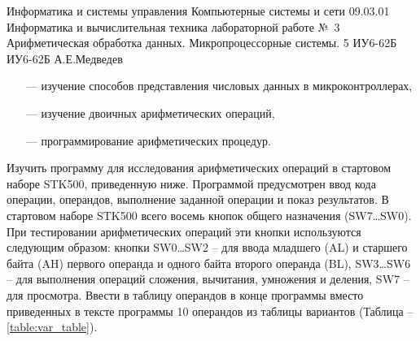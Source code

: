\documentclass{bmstu}
\begin{document}


\makeatletter %
\renewcommand\chapter{\par%
\thispagestyle{plain}%
\@afterindentfalse \secdef\@chapter\@schapter}
\makeatother

\def\numberWork{1}


\makereporttitle
    {Информатика и системы управления} %
    {Компьютерные системы и сети} %
    {09.03.01 Информатика и вычислительная техника} %
    {лабораторной работе №~3} %
    {Арифметическая обработка данных.} %
    {Микропроцессорные системы.} %
    {5} %
    {ИУ6-62Б} %
    {
    	{ИУ6-62Б}
    	{А.Е.Медведев} %
    	{} %
    } 

\chapter{Цель работы:}
\begin{enumerate}
\item[---] изучение способов представления числовых данных в микроконтроллерах, 
\item[---] изучение двоичных арифметических операций, 
\item[---] программирование арифметических процедур.
\end{enumerate}

\chapter{Задание 1. }

Изучить программу для исследования арифметических операций в стартовом наборе STK500, приведенную ниже.
Программой предусмотрен ввод кода операции, операндов, выполнение заданной операции и показ результатов.
В стартовом наборе STK500 всего восемь кнопок общего назначения (SW7…SW0). При тестировании арифметических операций эти кнопки используются следующим образом: кнопки SW0…SW2 – для ввода младшего (AL) и старшего байта (AH) первого операнда и одного байта второго операнда (BL), SW3…SW6 – для выполнения операций сложения, вычитания, умножения и деления, SW7 – для просмотра.
Ввести в таблицу операндов в конце программы вместо приведенных в тексте программы 10 операндов из таблицы вариантов (Таблица -- \ref{table:var_table}).
\end{document}
